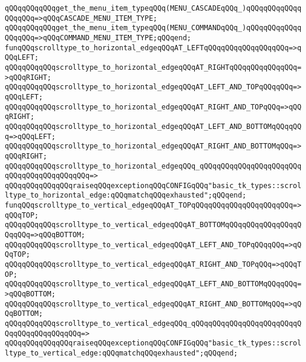 \verb|qQQqqQQqqQQqget_the_menu_item_typeqQQq(MENU_CASCADEqQQq_)qQQqqQQqqQQqqQQqqQQq=>qQQqCASCADE_MENU_ITEM_TYPE;|\newline
\verb|qQQqqQQqqQQqget_the_menu_item_typeqQQq(MENU_COMMANDqQQq_)qQQqqQQqqQQqqQQqqQQq=>qQQqCOMMAND_MENU_ITEM_TYPE;qQQqend;|\newline
\newline
\verb|funqQQqscrolltype_to_horizontal_edgeqQQqAT_LEFTqQQqqQQqqQQqqQQqqQQq=>qQQqLEFT;|\newline
\verb|qQQqqQQqqQQqscrolltype_to_horizontal_edgeqQQqAT_RIGHTqQQqqQQqqQQqqQQq=>qQQqRIGHT;|\newline
\verb|qQQqqQQqqQQqscrolltype_to_horizontal_edgeqQQqAT_LEFT_AND_TOPqQQqqQQq=>qQQqLEFT;|\newline
\verb|qQQqqQQqqQQqscrolltype_to_horizontal_edgeqQQqAT_RIGHT_AND_TOPqQQq=>qQQqRIGHT;|\newline
\verb|qQQqqQQqqQQqscrolltype_to_horizontal_edgeqQQqAT_LEFT_AND_BOTTOMqQQqqQQq=>qQQqLEFT;|\newline
\verb|qQQqqQQqqQQqscrolltype_to_horizontal_edgeqQQqAT_RIGHT_AND_BOTTOMqQQq=>qQQqRIGHT;|\newline
\verb|qQQqqQQqqQQqscrolltype_to_horizontal_edgeqQQq_qQQqqQQqqQQqqQQqqQQqqQQqqQQqqQQqqQQqqQQqqQQq=>|\newline
\verb|qQQqqQQqqQQqqQQqraiseqQQqexceptionqQQqCONFIGqQQq"basic_tk_types::scrolltype_to_horizontal_edge:qQQqmatchqQQqexhausted";qQQqend;|\newline
\newline
\verb|funqQQqscrolltype_to_vertical_edgeqQQqAT_TOPqQQqqQQqqQQqqQQqqQQqqQQq=>qQQqTOP;|\newline
\verb|qQQqqQQqqQQqscrolltype_to_vertical_edgeqQQqAT_BOTTOMqQQqqQQqqQQqqQQqqQQqqQQq=>qQQqBOTTOM;|\newline
\verb|qQQqqQQqqQQqscrolltype_to_vertical_edgeqQQqAT_LEFT_AND_TOPqQQqqQQq=>qQQqTOP;|\newline
\verb|qQQqqQQqqQQqscrolltype_to_vertical_edgeqQQqAT_RIGHT_AND_TOPqQQq=>qQQqTOP;|\newline
\verb|qQQqqQQqqQQqscrolltype_to_vertical_edgeqQQqAT_LEFT_AND_BOTTOMqQQqqQQq=>qQQqBOTTOM;|\newline
\verb|qQQqqQQqqQQqscrolltype_to_vertical_edgeqQQqAT_RIGHT_AND_BOTTOMqQQq=>qQQqBOTTOM;|\newline
\verb|qQQqqQQqqQQqscrolltype_to_vertical_edgeqQQq_qQQqqQQqqQQqqQQqqQQqqQQqqQQqqQQqqQQqqQQqqQQq=>|\newline
\verb|qQQqqQQqqQQqqQQqraiseqQQqexceptionqQQqCONFIGqQQq"basic_tk_types::scrolltype_to_vertical_edge:qQQqmatchqQQqexhausted";qQQqend;|\newline

